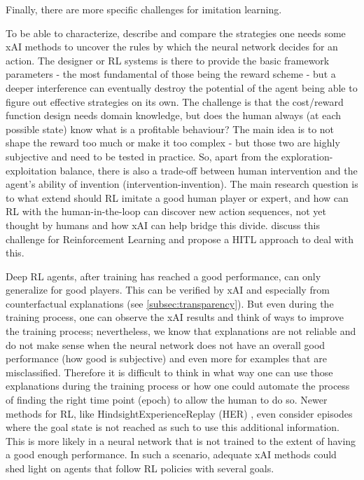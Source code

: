 \documentclass[twoside,11pt]{article}
\begin{document}
Finally, there are more specific challenges for imitation learning. 

To be able to characterize, describe and compare the strategies one needs some xAI methods to uncover the rules by which the neural network decides for an action. The designer or RL systems is there to provide the basic framework parameters - the most fundamental of those being the reward scheme - but a deeper interference can eventually destroy the potential of the agent being able to figure out effective strategies on its own. The challenge is that the cost/reward function design needs domain knowledge, but does the human always (at each possible state) know what is a profitable behaviour? The main idea is to not shape the reward too much or make it too complex - but those two are highly subjective and need to be tested in practice. So, apart from the exploration-exploitation balance, there is also a trade-off between human intervention and the agent's ability of invention (intervention-invention). The main research question is to what extend should RL imitate a good human player or expert, and how can RL with the human-in-the-loop can discover new action sequences, not yet thought by humans and how xAI can help bridge this divide. \cite{LeeSmithAbbeel:2021:FeedbackPreferenceHITLLearningPEBBLE} discuss this challenge for Reinforcement Learning and propose a HITL approach to deal with this.

Deep RL agents, after training has reached a good performance, can only generalize for good players. This can be verified by xAI and especially from counterfactual explanations (see \ref{subsec:transparency}). But even during the training process, one can observe the xAI results and think of ways to improve the training process; nevertheless, we know that explanations are not reliable and do not make sense when the neural network does not have an overall good performance (how good is subjective) and even more for examples that are misclassified. Therefore it is difficult to think in what way one can use those explanations during the training process or how one could automate the process of finding the right time point (epoch) to allow the human to do so. Newer methods for RL, like HindsightExperienceReplay (HER) \cite{Andrychowicz:2017:HERHindsightExperienceReplay}, even consider episodes where the goal state is not reached as such to use this additional information. This is more likely in a neural network that is not trained to the extent of having a good enough performance. In such a scenario, adequate xAI methods could shed light on agents that follow RL policies with several goals. 
\end{document}
